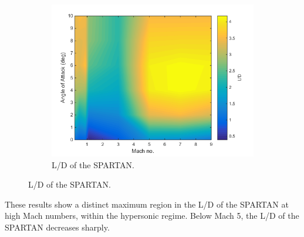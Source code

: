 \begin{figure}
\begin{subfigure}{.5\textwidth}
\includegraphics[width=0.99\linewidth]{figures/3_vehicle_design/LD}
\caption{L/D of the SPARTAN.}
\label{fig:LD}
\end{subfigure}
\end{figure}


These results show a distinct maximum region in the L/D of the SPARTAN at high Mach numbers, within the hypersonic regime. Below Mach 5, the L/D of the SPARTAN decreases sharply. 


